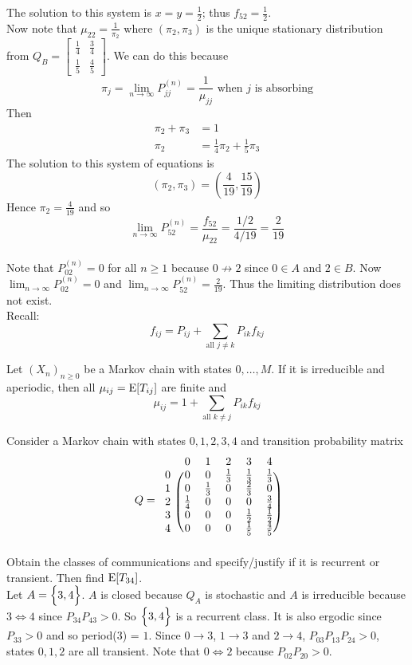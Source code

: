 \documentclass[12pt]{article}
\begin{document}
The solution to this system is $x = y = \frac{1}{2}$; thus $f_{52} = \frac{1}{2}$. \\ Now note that $\mu_{22} = \frac{1}{\pi_2}$ where $(\pi_2,\pi_3)$ is the unique stationary distribution from $Q_B = \begin{bmatrix} \frac{1}{4} & \frac{3}{4} \\ \frac{1}{5} & \frac{4}{5} \end{bmatrix} $. We can do this because $$ \pi_j = \lim_{n\to\infty} P_{jj}^{(n)} = \frac{1}{\mu_{jj}} \text{ when $j$ is absorbing} $$ Then $$ \begin{aligned} \pi_2 + \pi_3 &= 1 \\ \pi_2 &= \frac{1}{4}\pi_2 + \frac{1}{5}\pi_3 \end{aligned} $$ The solution to this system of equations is $$ (\pi_2,\pi_3) = (\frac{4}{19}, \frac{15}{19}) $$ Hence $\pi_2 = \frac{4}{19}$ and so $$ \lim_{n\to\infty} P_{52}^{(n)} = \frac{f_{52}}{\mu_{22}} = \frac{1/2}{4/19} = \frac{2}{19} $$ \\
Note that $P_{02}^{(n)} = 0$ for all $n\geq 1$ because $0 \not\to 2$ since $0 \in A$ and $2 \in B$. Now $\lim_{n\to\infty} P_{02}^{(n)} = 0$ and $\lim_{n\to\infty} P_{52}^{(n)} = \frac{2}{19}$. Thus the limiting distribution does not exist. \\
Recall: $$ f_{ij} = P_{ij} + \sum_{\text{all } j \neq k} P_{ik}f_{kj} $$ 
\begin{theorem} Let $(X_n)_{n\geq0}$ be a Markov chain with states $0,\dots,M$. If it is irreducible and aperiodic, then all $\mu_{ij} = \mathrm{E}[ T_{ij} ]$ are finite and $$ \mu_{ij} = 1 + \sum_{\text{all } k \neq j} P_{ik}f_{kj} $$ \end{theorem}
Consider a Markov chain with states $0,1,2,3,4$ and transition probability matrix $$ Q = \begin{blockarray}{cccccc}
&0&1&2&3&4 \\
\begin{block}{c(ccccc)}
0 & 0 & 0 & \frac{1}{3} & \frac{1}{3} & \frac{1}{3} \\
1 & 0 & \frac{1}{3} & 0 & \frac{2}{3} & 0  \\ 
2 & \frac{1}{4} & 0 & 0 & 0 & \frac{3}{4}   \\
3 & 0 & 0 & 0 & \frac{1}{2} & \frac{1}{2} \\ 
4 & 0 & 0 & 0 & \frac{1}{5} & \frac{4}{5} \\ \end{block} \end{blockarray} $$
Obtain the classes of communications and specify/justify if it is recurrent or transient. Then find $\mathrm{E}[ T_{34} ]$. \\ Let $A = \Big\{ 3,4 \Big\}$. $A$ is closed because $Q_A$ is stochastic and $A$ is irreducible because $3\iff4$ since $P_{34}P_{43} > 0$. So $\Big\{ 3,4 \Big\}$ is a recurrent class. It is also ergodic since $P_{33} > 0$ and so period($3$) = $1$. Since $0\to3$, $1\to3$ and $2\to4$, $P_{03}P_{13}P_{24} > 0$, states $0,1,2$ are all transient. Note that $0\iff 2$ because $P_{02}P_{20} > 0$. 
\end{document}
